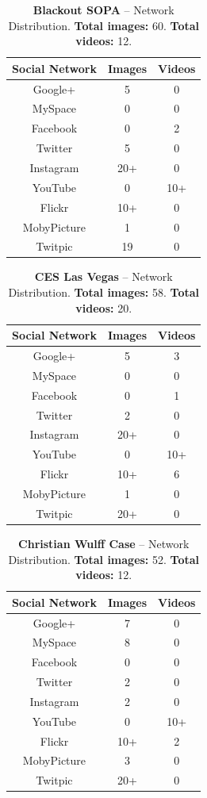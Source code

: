 \documentclass{acm_proc_article-sp}
\begin{document}
\begin{table}[htbp]
  \begin{tabular}{ | c | c | c | }
    \hline
    \textbf{Social Network} & \textbf{Images} & \textbf{Videos}\\
    \hline
    Google+ & 5 & 0\\
    MySpace & 0 & 0\\
    Facebook & 0 & 2\\
    Twitter & 5 & 0\\
    Instagram & 20+ & 0\\
    YouTube & 0 & 10+\\
    Flickr & 10+ & 0\\
    MobyPicture & 1 & 0\\
    Twitpic & 19 & 0\\
    \hline
  \end{tabular}
  \label{tab:sopa}
  \caption{\textbf{Blackout SOPA} -- Network Distribution. \textbf{Total images:} 60. \textbf{Total videos:} 12.}
\end{table}

\begin{table}[htbp]
  \begin{tabular}{ | c | c | c | }
    \hline
    \textbf{Social Network} & \textbf{Images} & \textbf{Videos}\\
    \hline
    Google+ & 5 & 3\\
    MySpace & 0 & 0\\
    Facebook & 0 & 1\\
    Twitter & 2 & 0\\
    Instagram & 20+ & 0\\
    YouTube & 0 & 10+\\
    Flickr & 10+ & 6\\
    MobyPicture & 1 & 0\\
    Twitpic & 20+ & 0\\
    \hline
  \end{tabular}
  \label{tab:ces}
  \caption{\textbf{CES Las Vegas} -- Network Distribution. \textbf{Total images:} 58. \textbf{Total videos:} 20.}
\end{table}

\begin{table}[htbp]
  \begin{tabular}{ | c | c | c | }
    \hline
    \textbf{Social Network} & \textbf{Images} & \textbf{Videos}\\
    \hline
    Google+ & 7 & 0\\
    MySpace & 8 & 0\\
    Facebook & 0 & 0\\
    Twitter & 2 & 0\\
    Instagram & 2 & 0\\
    YouTube & 0 & 10+\\
    Flickr & 10+ & 2\\
    MobyPicture & 3 & 0\\
    Twitpic & 20+ & 0\\
    \hline
  \end{tabular}
  \label{tab:wulff}
  \caption{\textbf{Christian Wulff Case} -- Network Distribution. \textbf{Total images:} 52. \textbf{Total videos:} 12.}
\end{table}
\end{document}
